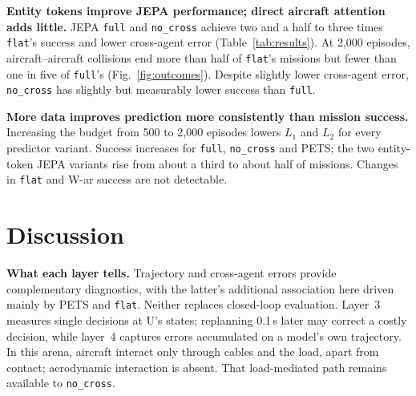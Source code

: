 \documentclass[conference]{IEEEtran}
\begin{document}
\textbf{Entity tokens improve JEPA performance; direct aircraft attention adds little.} JEPA \texttt{full} and \texttt{no\_cross} achieve two and a half to three times \texttt{flat}'s success and lower cross-agent error (Table~\ref{tab:results}). At 2,000 episodes, aircraft--aircraft collisions end more than half of \texttt{flat}'s missions but fewer than one in five of \texttt{full}'s (Fig.~\ref{fig:outcomes}). Despite slightly lower cross-agent error, \texttt{no\_cross} has slightly but measurably lower success than \texttt{full}.

\textbf{More data improves prediction more consistently than mission success.} Increasing the budget from 500 to 2,000 episodes lowers $L_1$ and $L_2$ for every predictor variant. Success increases for \texttt{full}, \texttt{no\_cross} and PETS; the two entity-token JEPA variants rise from about a third to about half of missions. Changes in \texttt{flat} and W-ar success are not detectable.


\section{Discussion}\label{sec:discussion}

\textbf{What each layer tells.} Trajectory and cross-agent errors provide complementary diagnostics, with the latter's additional association here driven mainly by PETS and \texttt{flat}. Neither replaces closed-loop evaluation. Layer~3 measures single decisions at U's states; replanning 0.1\,s later may correct a costly decision, while layer~4 captures errors accumulated on a model's own trajectory. In this arena, aircraft interact only through cables and the load, apart from contact; aerodynamic interaction is absent. That load-mediated path remains available to \texttt{no\_cross}.
\end{document}
